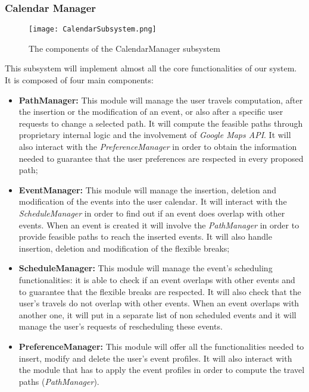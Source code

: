\subsubsection{Calendar Manager}
\label{subsubsect:Calendar Manager}
\begin{figure}[H]
	\begin{center}
		\hspace*{-60pt}
		\texttt{[image: CalendarSubsystem.png]}
	\end{center}
	\caption{The components of the CalendarManager subsystem}
\end{figure}
	This subsystem will implement almost all the core functionalities of our system.\\ It is composed of four main components:
	\begin{itemize}
		\item \textbf{PathManager:} This module will manage the user travels computation, after the insertion or the modification of an event, or also after a specific user requests to change a selected path. It will compute the feasible paths through proprietary internal logic and the involvement of \textit{Google Maps API}. It will also interact with the \textit{PreferenceManager} in order to obtain the information needed to guarantee that the user preferences are respected in every proposed path;
		\item \textbf{EventManager:} This module will manage the insertion, deletion and modification of the events into the user calendar. It will interact with the \textit{ScheduleManager} in order to find out if an event does overlap with other events. When an event is created it will involve the \textit{PathManager} in order to provide feasible paths to reach the inserted events. It will also handle insertion, deletion and modification of the flexible breaks;
		\item \textbf{ScheduleManager:} This module will manage the event's scheduling functionalities: it is able to check if an event overlaps with other events and to guarantee that the flexible breaks are respected. It will also check that the user's travels do not overlap with other events. When an event overlaps with another one, it will put in a separate list of non scheduled events and it will manage the user's requests of rescheduling these events.
		\item \textbf{PreferenceManager:} This module will offer all the functionalities needed to insert, modify and delete the user's event profiles. It will also interact with the module that has to apply the event profiles in order to compute the travel paths (\textit{PathManager}).
	\end{itemize}
	
